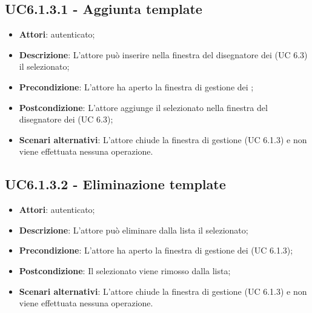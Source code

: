 \subsection{UC6.1.3.1 - Aggiunta template}
\label{ssec:UC6.1.3.1}
\begin{itemize}
\item \textbf{Attori}:  autenticato;
\item \textbf{Descrizione}: L'attore può inserire nella finestra del disegnatore dei  (UC 6.3) il  selezionato;
\item \textbf{Precondizione}: L'attore ha aperto la finestra di gestione dei ;
\item \textbf{Postcondizione}: L'attore aggiunge il  selezionato nella finestra del disegnatore dei (UC 6.3);
\item \textbf{Scenari alternativi}: L'attore chiude la finestra di gestione  (UC 6.1.3) e non viene effettuata nessuna operazione.
\end{itemize}
\subsection{UC6.1.3.2 - Eliminazione template}
\label{ssec:UC6.1.3.2}
\begin{itemize}
\item \textbf{Attori}:  autenticato;
\item \textbf{Descrizione}: L'attore può eliminare dalla lista il  selezionato;
\item \textbf{Precondizione}: L'attore ha aperto la finestra di gestione dei  (UC 6.1.3);
\item \textbf{Postcondizione}: Il  selezionato viene rimosso dalla lista;
\item \textbf{Scenari alternativi}: L'attore chiude la finestra di gestione  (UC 6.1.3) e non viene effettuata nessuna operazione.
\end{itemize}
\newpage
